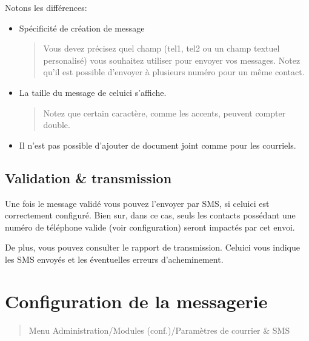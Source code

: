 \documentclass[a4paper,10pt,oneside,french]{sphinxmanual}
\begin{document}
\sphinxAtStartPar
Notons les différences:
\begin{itemize}
\item {} 
\sphinxAtStartPar
Spécificité de création de message
\begin{quote}

\sphinxAtStartPar
Vous devez précisez quel champ (tel1, tel2 ou un champ textuel personalisé) vous souhaitez utiliser pour envoyer vos messages.
Notez qu’il est possible d’envoyer à plusieurs numéro pour un même contact.
\end{quote}

\item {} 
\sphinxAtStartPar
La taille du message de celui\sphinxhyphen{}ci s’affiche.
\begin{quote}

\sphinxAtStartPar
Notez que certain caractère, comme les accents, peuvent compter double.
\end{quote}

\item {} 
\sphinxAtStartPar
Il n’est pas possible d’ajouter de document joint comme pour les courriels.

\end{itemize}


\subsection{Validation \& transmission}
\label{\detokenize{mailing/sms:validation-transmission}}
\sphinxAtStartPar
Une fois le message validé vous pouvez l’envoyer par SMS, si celui\sphinxhyphen{}ci est correctement configuré.
Bien sur, dans ce cas, seuls les contacts possédant une numéro de téléphone valide (voir configuration) seront impactés par cet envoi.

\sphinxAtStartPar
De plus, vous pouvez consulter le rapport de transmission.
Celui\sphinxhyphen{}ci vous indique les SMS envoyés et les éventuelles erreurs d’acheminement.


\section{Configuration de la messagerie}
\label{\detokenize{mailing/configuration:configuration-de-la-messagerie}}\label{\detokenize{mailing/configuration::doc}}\begin{quote}

\sphinxAtStartPar
Menu Administration/Modules (conf.)/Paramètres de courrier \& SMS
\end{quote}
\end{document}
